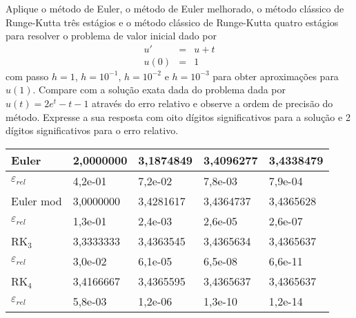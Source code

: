 \begin{exer}Aplique o método de Euler, o método de Euler melhorado, o método clássico de Runge-Kutta três estágios e o método clássico de Runge-Kutta quatro estágios para resolver o problema de valor inicial dado por
\begin{eqnarray}
u'&=& u + t\\
u(0)&=&1
\end{eqnarray}
com passo $h=1$, $h=10^{-1}$, $h=10^{-2}$ e $h=10^{-3}$  para obter aproximações para $u(1)$. Compare com a solução exata dada do problema dada por $u(t) =  2e^t-t-1$ através do erro relativo e observe a ordem de precisão do método. Expresse a sua resposta com oito dígitos significativos para a solução e 2 dígitos significativos para o erro relativo.
\end{exer}
\begin{resp}

\begin{center}
 \begin{tabular}{|l|l|l|l|l|}%
\hline
Euler & 2,0000000 & 3,1874849 & 3,4096277 & 3,4338479\\
\hline
$\varepsilon_{rel}$ & 4,2e-01 & 7,2e-02 & 7,8e-03 & 7,9e-04\\
\hline
Euler mod & 3,0000000 & 3,4281617 & 3,4364737 & 3,4365628\\
\hline
$\varepsilon_{rel}$ & 1,3e-01 & 2,4e-03 & 2,6e-05 & 2,6e-07\\
\hline
RK$_3$ & 3,3333333 & 3,4363545 & 3,4365634 & 3,4365637\\
\hline
$\varepsilon_{rel}$ & 3,0e-02 & 6,1e-05 & 6,5e-08 & 6,6e-11\\
\hline
RK$_4$ & 3,4166667 & 3,4365595 & 3,4365637 & 3,4365637\\
\hline
$\varepsilon_{rel}$ & 5,8e-03 & 1,2e-06 & 1,3e-10 & 1,2e-14\\
\hline
\end{tabular}
\end{center}
\end{resp}



